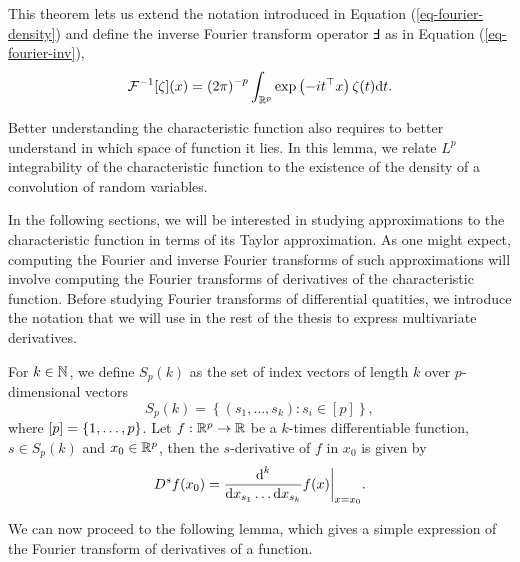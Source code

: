 This theorem lets us extend the notation introduced in Equation (\ref{eq-fourier-density}) and define the inverse Fourier transform operator $\Finv$ as in Equation (\ref{eq-fourier-inv}),
\begin{equation*}
    {\mathcal{F}^{-1}}[\zeta](x) = \left(2\pi\right)^{-p}\int_{\mathbb{R}^p} \exp\left(-i t^\top x\right) \zeta(t) \text{d} t.
\end{equation*}

Better understanding the characteristic function also requires to better understand in which space of function it lies. In this lemma, we relate $L^p$ integrability of the characteristic function to the existence of the density of a convolution of random variables.



In the following sections, we will be interested in studying approximations to the characteristic function in terms of its Taylor approximation. As one might expect, computing the Fourier and inverse Fourier transforms of such approximations will involve computing the Fourier transforms of derivatives of the characteristic function. Before studying Fourier transforms of differential quatities, we introduce the notation that we will use in the rest of the thesis to express multivariate derivatives.

For $k \in \mathbb{N}$, we define $S_p(k)$ as the set of index vectors of length $k$ over $p$-dimensional vectors
\begin{equation*}
    S_p(k) = \left\{ (s_1, \ldots, s_k) : s_i \in [p] \right\},
\end{equation*}
where $[p] = {\left\{1, \ldots, p\right\}}$. Let $f : {\mathbb{R}^p} \rightarrow \mathbb{R}$ be a $k$-times differentiable function, $s \in S_p(k)$ and $x_0 \in {\mathbb{R}^p}$, then the $s$-derivative of $f$ in $x_0$ is given by
\begin{equation*}
    D^s f(x_0) = \frac{\text{d}^k}{\text{d} x_{s_1} \ldots \text{d} x_{s_k}} f(x) \bigg|_{x=x_0}.
\end{equation*}

We can now proceed to the following lemma, which gives a simple expression of the Fourier transform of derivatives of a function.

